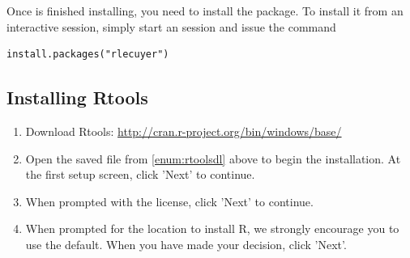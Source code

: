 Once  is finished installing, you need to install the  \href{http://cran.r-project.org/web/packages/rlecuyer/index.html}{} package.  To install it from an interactive  session, simply start an  session and issue the command
\begin{lstlisting}[language=rr]
install.packages("rlecuyer")
\end{lstlisting}





\subsection{Installing Rtools}

\begin{enumerate}
  \item Download Rtools: \url{http://cran.r-project.org/bin/windows/base/} \label{enum:rtoolsdl}
  \item Open the saved file from \ref{enum:rtoolsdl} above to begin the installation.  At the first setup screen, click 'Next' to continue.
  \item When prompted with the license, click 'Next' to continue.
  \item When prompted for the location to install R, we strongly encourage you to use the default.  When you have made your decision, click 'Next'.

\end{enumerate}
